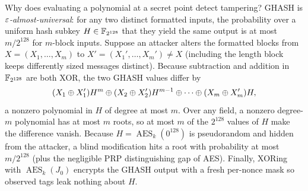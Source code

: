 \begin{whybox}
Why does evaluating a polynomial at a secret point detect tampering? GHASH is \emph{$\varepsilon$-almost-universal}: for any two distinct formatted inputs, the probability over a uniform hash subkey $H \in \mathbb{F}_{2^{128}}$ that they yield the same output is at most $m / 2^{128}$ for $m$-block inputs. Suppose an attacker alters the formatted blocks from $X = (X_1,\dots,X_m)$ to $X' = (X_1',\dots,X_m') \neq X$ (including the length block keeps differently sized messages distinct). Because subtraction and addition in $\mathbb{F}_{2^{128}}$ are both XOR, the two GHASH values differ by
\[
(X_1 \oplus X_1')H^m \oplus (X_2 \oplus X_2')H^{m-1} \oplus \cdots \oplus (X_m \oplus X_m')H,
\]
a nonzero polynomial in $H$ of degree at most $m$. Over any field, a nonzero degree-$m$ polynomial has at most $m$ roots, so at most $m$ of the $2^{128}$ values of $H$ make the difference vanish. Because $H = \operatorname{AES}_k(0^{128})$ is pseudorandom and hidden from the attacker, a blind modification hits a root with probability at most $m / 2^{128}$ (plus the negligible PRP distinguishing gap of AES). Finally, XORing with $\operatorname{AES}_k(J_0)$ encrypts the GHASH output with a fresh per-nonce mask so observed tags leak nothing about $H$.
\end{whybox}

